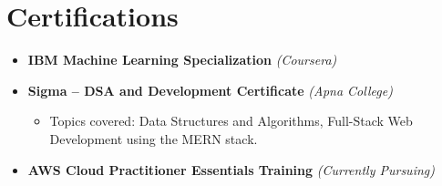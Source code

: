 \documentclass[letterpaper,9pt]{article}
\begin{document}
\section*{Certifications}
\begin{itemize}
\item \textbf{IBM Machine Learning Specialization}  
\textit{(Coursera)}

\item \textbf{Sigma – DSA and Development Certificate}  
\textit{(Apna College)} 
\begin{itemize}
\item Topics covered: Data Structures and Algorithms, Full-Stack Web Development using the MERN stack.

\end{itemize}

\item \textbf{AWS Cloud Practitioner Essentials Training}  
\textit{(Currently Pursuing)}
\end{itemize}
\end{document}
